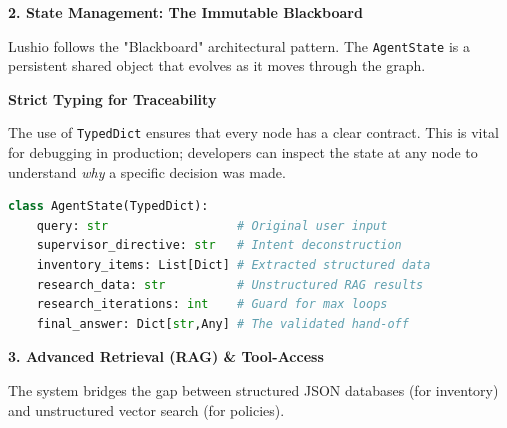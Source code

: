\documentclass[11pt,a4paper]{article}
\newcommand{\mysection}[1]{%
    \vspace{0.4cm}%
    {\color{lushioblue}\Large\bfseries #1}%
    \par\vspace{0.2cm}%
}
\newcommand{\mysubsection}[1]{%
    \vspace{0.3cm}%
    {\color{pwcgrey}\large\bfseries #1}%
    \par\vspace{0.1cm}%
}
\begin{document}
\begin{center}
\end{center}

\mysection{2. State Management: The Immutable Blackboard}
Lushio follows the "Blackboard" architectural pattern. The \texttt{AgentState} is a persistent shared object that evolves as it moves through the graph.

\mysubsection{Strict Typing for Traceability}
The use of \texttt{TypedDict} ensures that every node has a clear contract. This is vital for debugging in production; developers can inspect the state at any node to understand \textit{why} a specific decision was made.

\begin{lstlisting}[language=Python]
class AgentState(TypedDict):
    query: str                  # Original user input
    supervisor_directive: str   # Intent deconstruction
    inventory_items: List[Dict] # Extracted structured data
    research_data: str          # Unstructured RAG results
    research_iterations: int    # Guard for max loops
    final_answer: Dict[str,Any] # The validated hand-off
\end{lstlisting}

\mysection{3. Advanced Retrieval (RAG) \& Tool-Access}
The system bridges the gap between structured JSON databases (for inventory) and unstructured vector search (for policies).
\end{document}
